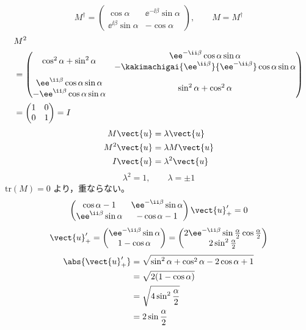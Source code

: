 \[ M^{\dagger}=\begin{pmatrix}\cos\alpha & \ee^{-\ii\beta}\sin\alpha\\ \ee^{\ii\beta}\sin\alpha & -\cos\alpha\end{pmatrix},\qquad M=M^{\dagger} \]
\begin{align*}
&M^{2}\\
&=\begin{pmatrix}\cos^{2}\alpha+\sin^{2}\alpha & \begin{matrix}\ee^{-\ii\beta}\cos\alpha\sin\alpha\\ -\kakimachigai{\ee^{\ii\beta}}{\ee^{-\ii\beta}}\cos\alpha\sin\alpha\end{matrix}\\[3ex] \begin{matrix}\ee^{\ii\beta}\cos\alpha\sin\alpha\\ -\ee^{\ii\beta}\cos\alpha\sin\alpha\end{matrix} & \sin^{2}\alpha+\cos^{2}\alpha\end{pmatrix}\\
&=\begin{pmatrix}1&0\\0&1\end{pmatrix}=I
\end{align*}
\begin{align*}
M\vect{u}&=\lambda\vect{u}\\
M^{2}\vect{u}&=\lambda M\vect{u}\\
I\vect{u}&=\lambda^{2}\vect{u}
\end{align*}
\[ \lambda^{2}=1,\qquad \lambda=\pm1 \]
$\mathrm{tr}(M)=0$ より，重ならない。
\[ \begin{pmatrix}\cos\alpha-1 & \ee^{-\ii\beta}\sin\alpha\\ \ee^{\ii\beta}\sin\alpha & -\cos\alpha-1\end{pmatrix}\vect{u}_{+}'=0 \]
\[ \vect{u}_{+}'=\begin{pmatrix}\ee^{-\ii\beta}\sin\alpha\\ 1-\cos\alpha\end{pmatrix}=\begin{pmatrix}2\ee^{-\ii\beta}\sin\frac{\alpha}{2}\cos\frac{\alpha}{2}\\ 2\sin^{2}\frac{\alpha}{2}\end{pmatrix} \]
\begin{align*}
\abs{\vect{u}_{+}'}&=\sqrt{\sin^{2}\alpha+\cos^{2}\alpha-2\cos\alpha+1}\\
&=\sqrt{2(1-\cos\alpha)}\\
&=\sqrt{4\sin^{2}\frac{\alpha}{2}}\\
&=2\sin\frac{\alpha}{2}
\end{align*}
